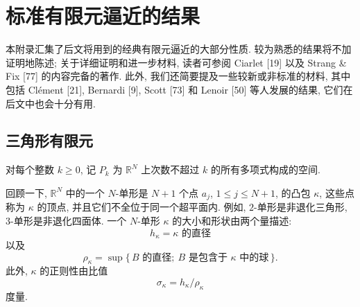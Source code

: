 \appendix
\chapter{标准有限元逼近的结果}\label{app:standard-finite-element-approximation}
\renewcommand{\theequation}{A.\arabic{equation}}
\renewcommand{\thestatement}{A.\arabic{statement}}
\renewcommand{\thefigure}{\arabic{figure}}
\setcounter{equation}{0}
\setcounter{statement}{0}
\setcounter{figure}{2}

本附录汇集了后文将用到的经典有限元逼近的大部分性质.
较为熟悉的结果将不加证明地陈述; 关于详细证明和进一步材料,
读者可参阅 Ciarlet [19] 以及 Strang \& Fix [77] 的内容完备的著作.
此外, 我们还简要提及一些较新或非标准的材料,
其中包括 Clément [21], Bernardi [9], Scott [73] 和 Lenoir [50]
等人发展的结果, 它们在后文中也会十分有用.

\section{三角形有限元}\label{sec:appendix-triangular-finite-elements}

\begin{Definition}\label{def:appendix-polynomial-space-pk}
对每个整数 $k\geq0$, 记 $P_k$ 为 $\mathbb{R}^N$ 上次数不超过 $k$
的所有多项式构成的空间.
\end{Definition}

回顾一下, $\mathbb{R}^N$ 中的一个 $N$-单形是 $N+1$ 个点
$a_j$, $1\leq j\leq N+1$, 的凸包 $\kappa$, 这些点称为
$\kappa$ 的顶点, 并且它们不全位于同一个超平面内.
例如, $2$-单形是非退化三角形, $3$-单形是非退化四面体.
一个 $N$-单形 $\kappa$ 的大小和形状由两个量描述:
\[
h_\kappa=\text{$\kappa$ 的直径}
\]
以及
\[
\rho_\kappa
=
\sup\{\,\text{$B$ 的直径};\ \text{$B$ 是包含于 $\kappa$ 中的球}\,\}.
\]
此外, $\kappa$ 的正则性由比值
\[
\sigma_\kappa=h_\kappa/\rho_\kappa
\]
度量.


